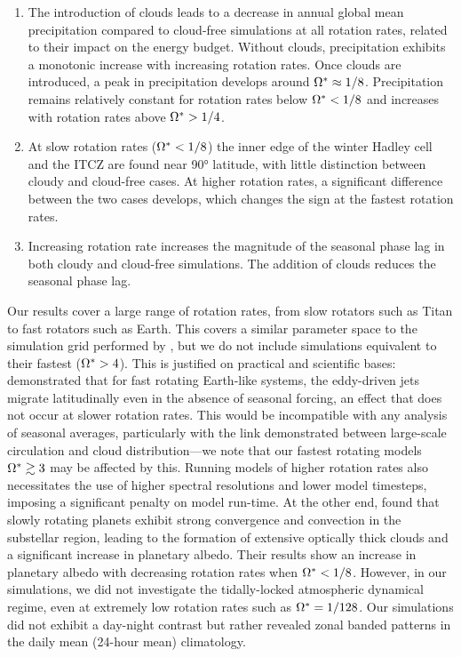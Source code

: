 \begin{enumerate}
    \item The introduction of clouds leads to a decrease in annual global mean precipitation compared to cloud-free simulations at all rotation rates, related to their impact on the energy budget. Without clouds, precipitation exhibits a monotonic increase with increasing rotation rates. Once clouds are introduced, a peak in precipitation develops around $\Omega^*\approx 1/8$. Precipitation remains relatively constant for rotation rates below $\Omega^*<1/8$ and increases with rotation rates above $\Omega^*>1/4$.

    \item At slow rotation rates ($\Omega^*<1/8$) the inner edge of the winter Hadley cell and the ITCZ are found near \ang{90} latitude, with little distinction between cloudy and cloud-free cases. At higher rotation rates, a significant difference between the two cases develops, which changes the sign at the fastest rotation rates.

    \item Increasing rotation rate increases the magnitude of the seasonal phase lag in both cloudy and cloud-free simulations. The addition of clouds reduces the seasonal phase lag.

\end{enumerate}

Our results cover a large range of rotation rates, from slow rotators such as Titan to fast rotators such as Earth. This covers a similar parameter space to the simulation grid performed by \citet{kaspi2015-ATMOSPHERIC}, but we do not include simulations equivalent to their fastest ($\Omega^*>4$). This is justified on practical and scientific bases: \citet{chemke2015-Poleward} demonstrated that for fast rotating Earth-like systems, the eddy-driven jets migrate latitudinally even in the absence of seasonal forcing, an effect that does not occur at slower rotation rates. This would be incompatible with any analysis of seasonal averages, particularly with the link demonstrated between large-scale circulation and cloud distribution---we note that our fastest rotating models $\Omega^* \gtrsim 3$ may be affected by this. Running models of higher rotation rates also necessitates the use of higher spectral resolutions and lower model timesteps, imposing a significant penalty on model run-time. At the other end, \citet{yang2014-STRONG} found that slowly rotating planets exhibit strong convergence and convection in the substellar region, leading to the formation of extensive optically thick clouds and a significant increase in planetary albedo. Their results show an increase in planetary albedo with decreasing rotation rates when $\Omega^*<1/8$. However, in our simulations, we did not investigate the tidally-locked atmospheric dynamical regime, even at extremely low rotation rates such as $\Omega^*=1/128$. Our simulations did not exhibit a day-night contrast but rather revealed zonal banded patterns in the daily mean (24-hour mean) climatology.


